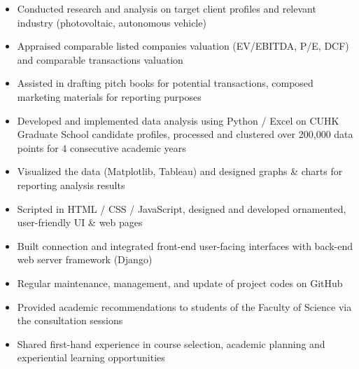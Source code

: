 \documentclass[10pt]{article}
\begin{document}
    \begin{itemize}
        \item Conducted research and analysis on target client profiles and relevant industry (photovoltaic, autonomous vehicle)
        \item Appraised comparable listed companies valuation (EV/EBITDA, P/E, DCF) and comparable transactions valuation
        \item Assisted in drafting pitch books for potential transactions, composed marketing materials for reporting purposes
    \end{itemize}
    \begin{itemize}
        \item Developed and implemented data analysis using Python / Excel on CUHK Graduate School candidate profiles, processed and clustered over 200,000 data points for 4 consecutive academic years
        \item Visualized the data (Matplotlib, Tableau) and designed graphs \& charts for reporting analysis results
    \end{itemize}
    \begin{itemize}
        \item Scripted in HTML / CSS / JavaScript, designed and developed ornamented, user-friendly UI \& web pages
        \item Built connection and integrated front-end user-facing interfaces with back-end web server framework (Django)
        \item Regular maintenance, management, and update of project codes on GitHub
    \end{itemize}
    \begin{itemize}
        \item Provided academic recommendations to students of the Faculty of Science via the consultation sessions
        \item Shared first-hand experience in course selection, academic planning and experiential learning opportunities
    \end{itemize}
    
\end{document}
